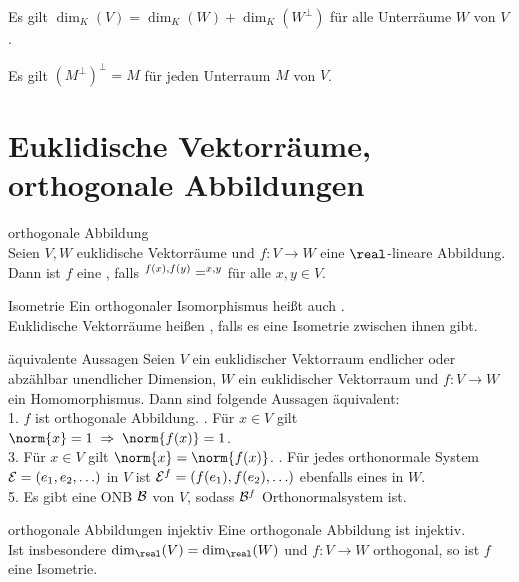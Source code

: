 \begin{Kor}
    Es gilt $\dim_K(V) = \dim_K(W) + \dim_K(W^\bot)$ für alle Unterräume
    $W$ von $V$.
\end{Kor}

\begin{Kor}
    Es gilt $(M^\bot)^\bot = M$ für jeden Unterraum $M$ von $V$.
\end{Kor}

\section{%
    Euklidische Vektorräume, orthogonale Abbildungen%
}

\begin{Def}{orthogonale Abbildung} \\
    Seien $V, W$ euklidische Vektorräume und $f: V \rightarrow W$ eine
    $\real$-lineare Abbildung. \\
    Dann ist $f$ eine , falls
    $\sp{f(x), f(y)} = \sp{x, y}$ für alle $x, y \in V$.
\end{Def}

\begin{Def}{Isometrie}
    Ein orthogonaler Isomorphismus heißt auch . \\
    Euklidische Vektorräume heißen , falls es eine
    Isometrie zwischen ihnen gibt.
\end{Def}

\begin{Satz}{äquivalente Aussagen}
    Seien $V$ ein euklidischer Vektorraum endlicher oder abzählbar unendlicher
    Dimension, $W$ ein euklidischer Vektorraum und $f: V \rightarrow W$ ein
    Homomorphismus.
    Dann sind folgende Aussagen äquivalent: \\
    1. $f$ ist orthogonale Abbildung. . Für $x \in V$ gilt
    $\norm{x} = 1 \;\Rightarrow\; \norm{f(x)} = 1$. \\
    3. Für $x \in V$ gilt $\norm{x} = \norm{f(x)}$. . Für jedes orthonormale System $\mathcal{E} = (e_1, e_2, \ldots)$ in $V$
    ist $\mathcal{E}^f = (f(e_1), f(e_2), \ldots)$ ebenfalls eines in $W$. \\
    5. Es gibt eine ONB $\mathcal{B}$ von $V$, sodass $\mathcal{B}^f$
    Orthonormalsystem ist.
\end{Satz}

\begin{Satz}{orthogonale Abbildungen injektiv}
    Eine orthogonale Abbildung ist injektiv. \\
    Ist insbesondere $\dim_\real(V) = \dim_\real(W)$ und $f: V \rightarrow W$
    orthogonal, so ist $f$ eine Isometrie.
\end{Satz}

